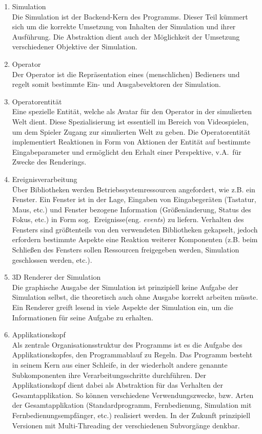 \begin{enumerate}
\item Simulation\\
Die Simulation ist der Backend-Kern des Programms. Dieser Teil kümmert sich um die korrekte Umsetzung von Inhalten der Simulation und ihrer Ausführung. Die Abstraktion dient auch der Möglichkeit der Umsetzung verschiedener Objektive der Simulation.
\item Operator\\
Der Operator ist die Repräsentation eines (menschlichen) Bedieners und regelt somit bestimmte Ein- und Ausgabevektoren der Simulation.
\item Operatorentität\\
Eine spezielle Entität, welche als Avatar für den Operator in der simulierten Welt dient. Diese Spezialisierung ist essentiell im Bereich von Videospielen, um dem Spieler Zugang zur simulierten Welt zu geben. Die Operatorentität implementiert Reaktionen in Form von Aktionen der Entität auf bestimmte Eingabeparameter und ermöglicht den Erhalt einer Perspektive, v.A.~für Zwecke des Renderings.
\item Ereignisverarbeitung\\
Über Bibliotheken werden Betriebssystemressourcen angefordert, wie z.B. ein Fenster. Ein Fenster ist in der Lage, Eingaben von Eingabegeräten (Tastatur, Maus, etc.) und Fenster bezogene Information (Größenänderung, Status des Fokus, etc.) in Form sog.~Ereignisse(eng. \textit{events}) zu liefern. Verhalten des Fensters sind größtenteils von den verwendeten Bibliotheken gekapselt, jedoch erfordern bestimmte Aspekte eine Reaktion weiterer Komponenten (z.B. beim Schließen des Fensters sollen Ressourcen freigegeben werden, Simulation geschlossen werden, etc.).
\item 3D Renderer der Simulation\\
Die graphische Ausgabe der Simulation ist prinzipiell keine Aufgabe der Simulation selbst, die theoretisch auch ohne Ausgabe korrekt arbeiten müsste. Ein Renderer greift lesend in viele Aspekte der Simulation ein, um die Informationen für seine Aufgabe zu erhalten.

\item Applikationskopf\\
Als zentrale Organisationsstruktur des Programms ist es die Aufgabe des Applikationskopfes, den Programmablauf zu Regeln. Das Programm besteht in seinem Kern aus einer Schleife, in der wiederholt andere genannte Subkomponenten ihre Verarbeitungsschritte durchführen. Der Applikationskopf dient dabei als Abstraktion für das Verhalten der Gesamtapplikation. So können verschiedene Verwendungszwecke, bzw. Arten der Gesamtapplikation (Standardprogramm, Fernbedienung, Simulation mit Fernbedienungsempfänger, etc.) realisiert werden. In der Zukunft prinzipiell Versionen mit Multi-Threading der verschiedenen Subvorgänge denkbar.
\end{enumerate}


